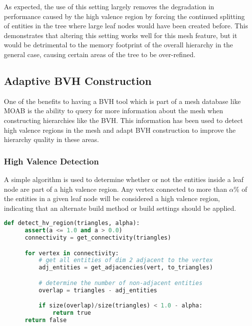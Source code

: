 As expected, the use of this setting largely removes the degradation in performance
caused by the high valence region by forcing the continued splitting of entities
in the tree where large leaf nodes would have been created before. This
demonstrates that altering this setting works well for this mesh feature, but it
would be detrimental to the memory footprint of the overall hierarchy in the
general case, causing certain areas of the tree to be over-refined. 


\subsection{Adaptive BVH Construction}\label{subsec:adaptive_construction}

One of the benefits to having a BVH tool which is part of a mesh database like
MOAB is the ability to query for more information about the mesh when
constructing hierarchies like the BVH. This information has been used to detect
high valence regions in the mesh and adapt BVH construction to improve the
hierarchy quality in these areas.

\subsubsection{High Valence Detection}\label{subsubsec:hv_detection}

A simple algorithm is used to determine whether or not the entities inside a
leaf node are part of a high valence region. Any vertex connected to more than
$\alpha$\% of the entities in a given leaf node will be considered a high valence
region, indicating that an alternate build method or build settings should be
applied.

\begin{lstlisting}[language=Python,basicstyle=\tiny,caption={Algorithm for detecting HV regions.},label={alg:hv_detect},captionpos=b]
  def detect_hv_region(triangles, alpha):
      assert(a <= 1.0 and a > 0.0)
      connectivity = get_connectivity(triangles)

      for vertex in connectivity:
          # get all entities of dim 2 adjacent to the vertex
          adj_entities = get_adjacencies(vert, to_triangles)

          # determine the number of non-adjacent entities
          overlap = triangles - adj_entities

          if size(overlap)/size(triangles) < 1.0 - alpha:
              return true
      return false
\end{lstlisting}

